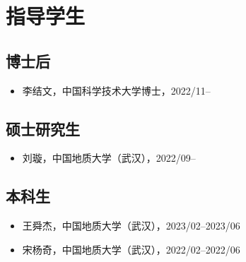 \section{指导学生}

\subsection{博士后}
\begin{itemize}
\item 李结文，中国科学技术大学博士，2022/11--
\end{itemize}

\subsection{硕士研究生}
\begin{itemize}
\item 刘璇，中国地质大学（武汉），2022/09--
\end{itemize}

\subsection{本科生}
\begin{itemize}
\item 王舜杰，中国地质大学（武汉），2023/02--2023/06
\item 宋杨奇，中国地质大学（武汉），2022/02--2022/06
\end{itemize}
